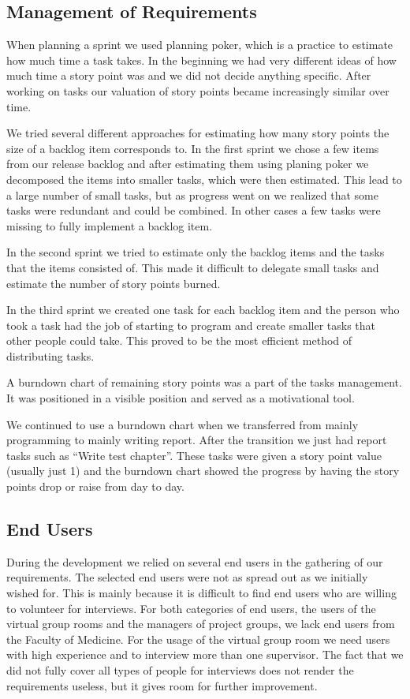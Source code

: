 \subsection{Management of Requirements}
When planning a sprint we used planning poker, which is a \scrum{} practice to estimate how much time a task takes. 
In the beginning we had very different ideas of how much time a story point was and we did not decide anything specific. 
After working on tasks our valuation of story points became increasingly similar over time.

We tried several different approaches for estimating how many story points the size of a backlog item corresponds to. 
In the first sprint we chose a few items from our release backlog and after estimating them using planing poker we decomposed the items into smaller tasks, which were then estimated. 
This lead to a large number of small tasks, but as progress went on we realized that some tasks were redundant and could be combined. 
In other cases a few tasks were missing to fully implement a backlog item.

In the second sprint we tried to estimate only the backlog items and the tasks that the items consisted of.
This made it difficult to delegate small tasks and estimate the number of story points burned.

In the third sprint we created one task for each backlog item and the person who took a task had the job of starting to program and create smaller tasks that other people could take. 
This proved to be the most efficient method of distributing tasks.

A burndown chart of remaining story points was a part of the tasks management.
It was positioned in a visible position and served as a motivational tool.

We continued to use a burndown chart when we transferred from mainly programming to mainly writing report.
After the transition we just had report tasks such as ``Write test chapter''.
These tasks were given a story point value (usually just 1) and the burndown chart showed the progress by having the story points drop or raise from day to day.

\subsection{End Users}
During the development we relied on several end users in the gathering of our requirements.
The selected end users were not as spread out as we initially wished for. 
This is mainly because it is difficult to find end users who are willing to volunteer for interviews. 
For both categories of end users, the users of the virtual group rooms and the managers of project groups, we lack end users from the Faculty of Medicine.
For the usage of the virtual group room we need users with high experience and to interview more than one supervisor.
The fact that we did not fully cover all types of people for interviews does not render the requirements useless, but it gives room for further improvement.